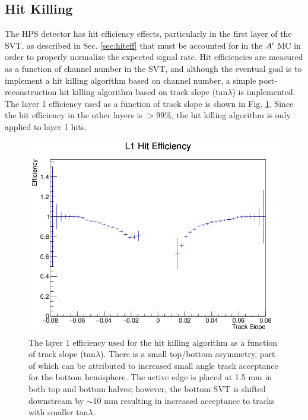 
\clearpage

\subsection{Hit Killing}\label{sec:hitkill}
The HPS detector has hit efficiency effects, particularly in the first layer of the SVT,  as described in Sec. \ref{sec:hiteff} that must be accounted for in the $A^\prime$ MC in order to properly normalize the expected signal rate. Hit efficiencies are measured as a function of channel number in the SVT, and although the eventual goal is to implement a hit killing algorithm based on channel number, a simple post-reconstruction hit killing algorithm based on track slope (tan$\lambda$) is implemented. The layer 1 efficiency used as a function of track slope is shown in Fig. \ref{fig:L1_eff}. Since the hit efficiency in the other layers is $>99$\%, the hit killing algorithm is only applied to layer 1 hits. %

\begin{figure}[t]
    \centering
    \includegraphics[width=.45\textwidth]{figs/recon/L1_eff.png}
    \caption{%
    The layer 1 efficiency used for the hit killing algorithm as a function of track slope (tan$\lambda$). There is a small top/bottom asymmetry, part of which can be attributed to increased small angle track acceptance for the bottom hemisphere. The active edge is placed at 1.5 mm in both top and bottom halves; however, the bottom SVT is shifted downstream by $\sim$10 mm resulting in increased acceptance to tracks with smaller tan$\lambda$.}
    \label{fig:L1_eff}
\end{figure}


